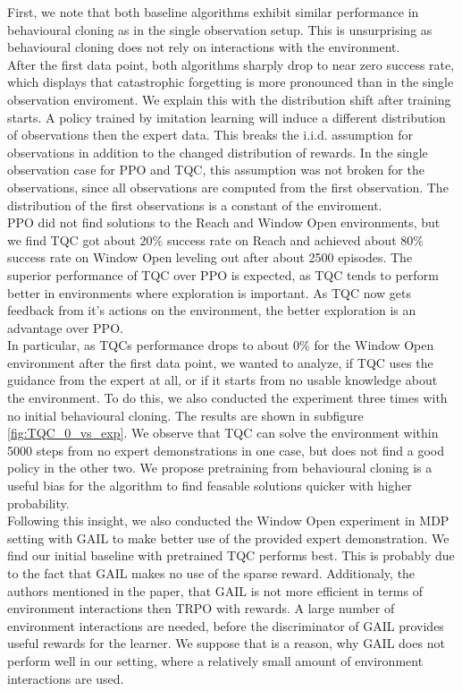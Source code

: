 First, we note that both baseline algorithms exhibit similar performance in behavioural cloning as in the single 
observation setup. This is unsurprising as behavioural cloning does not rely on interactions with the environment. \\

After the first data point, both algorithms sharply drop to near zero success rate, which displays that catastrophic forgetting is more 
pronounced than in the single observation enviroment. We explain this with the distribution shift after training starts. A policy trained by imitation learning 
will induce a different distribution of observations then the expert data. This breaks the i.i.d. assumption for observations in addition to the changed distribution of rewards. 
In the single observation case for PPO and TQC, this assumption was not broken for the observations, 
since all observations are computed from the first observation. The distribution of the first observations is a constant of the enviroment.\\

PPO did not find solutions to the Reach and Window Open environments, 
but we find TQC got about $20 \%$ success rate on Reach and achieved about $80 \%$ success rate on Window Open leveling out after about 2500 episodes. 
The superior performance of TQC over PPO is expected, as TQC tends to perform better in environments where exploration is important. As TQC now gets 
feedback from it's actions on the environment, the better exploration is an advantage over PPO.\\ 

In particular, as TQCs performance drops to about $0 \%$ for the Window Open 
environment after the first data point, we wanted to analyze, if TQC uses the guidance from the expert at all, or if it starts from 
no usable knowledge about the environment. To do this, we also conducted the experiment three times with no initial behavioural cloning. The results are shown in 
subfigure \ref{fig:TQC_0_vs_exp}. We observe that TQC can solve the environment within 5000 steps from no expert demonstrations in one case, but does not find a good policy in the other two. 
We propose pretraining from behavioural cloning is a useful bias for the algorithm to find feasable solutions quicker with higher probability.\\ 

Following this insight, 
we also conducted the Window Open experiment in MDP setting with GAIL to make better use of the provided expert demonstration. We find our initial 
baseline with pretrained TQC performs best. This is probably due to the fact that GAIL makes no use of the sparse reward. Additionaly, 
the authors mentioned in the paper, that GAIL is not more efficient in terms of environment interactions then TRPO with rewards. A large number of 
environment interactions are needed, before the discriminator of GAIL provides useful rewards for the learner. We suppose that is a reason, why GAIL does not perform 
well in our setting, where a relatively small amount of environment interactions are used. \\

